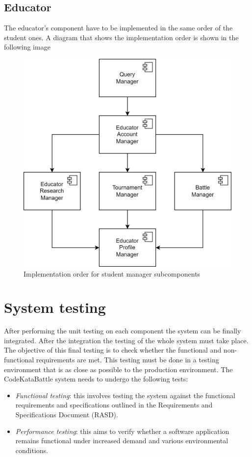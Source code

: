 \documentclass[12pt, a4paper]{report}
\begin{document}
    \subsection{Educator}
    The educator's component have to be implemented in the same order of the student ones. 
    A diagram that shows the implementation order is shown in the following image
    \begin{figure}[H]
        \centering
        \includegraphics[width=0.5\linewidth]{images/educator_impl.png}
        \caption{Implementation order for student manager subcomponents}
    \end{figure}



    \section{System testing}
    After performing the unit testing on each component the system can be finally integrated. 
    After the integration the testing of the whole system must take place. 
    The objective of this final testing is to check whether the functional and non-functional requirements are met. 
    This testing must be done in a testing environment that is as close as possible to the production environment.
    The CodeKataBattle system needs to undergo the following tests: 
    \begin{itemize}
        \item \textit{Functional testing}: this involves testing the system against the functional requirements and specifications outlined in the Requirements and Specifications Document (RASD).
        \item \textit{Performance testing}: this aims to verify whether a software application remains functional under increased demand and various environmental conditions.
    \end{itemize}
\end{document}
